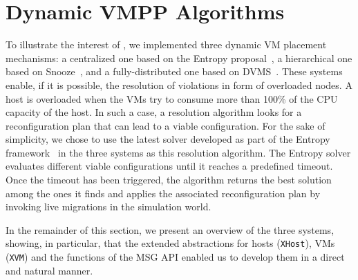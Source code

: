 \section{Dynamic VMPP Algorithms}
\label{sec:vm-schedulers}
\vspace*{-.2cm}
To illustrate the interest of \vmps, we implemented three dynamic VM
placement mechanisms: a centralized one based on the Entropy
proposal~\cite{Hermenier:2009:ECM:1508293.1508300}, a hierarchical one
based on Snooze~\cite{feller:ccgrid12}, and a fully-distributed one
based on DVMS~\cite{quesnel:cpe2012}.
%
These systems enable, if it is possible,  the resolution  of violations in form of
overloaded nodes. A host is overloaded when the VMs try to consume
more than 100\% of the CPU capacity of the host. In such a case, a
resolution algorithm looks for a reconfiguration plan that can lead to
a viable configuration. For the sake of
simplicity, we chose to use the latest solver developed as part of the Entropy
framework~\cite{hermenier:cp11} in the three systems as this resolution algorithm.
The Entropy solver evaluates different viable configurations until  it
reaches a predefined timeout.
Once the timeout has been triggered, the algorithm returns the best
solution among the ones it finds and applies the associated
reconfiguration plan by invoking live migrations in the simulation
world.
%
%


In the remainder of this section, we present an overview of the
three systems, showing, in particular, that the extended abstractions
for hosts (\texttt{XHost}), VMs (\texttt{XVM}) and the functions of
the \sg MSG API enabled us to develop them in a direct and natural
manner.

